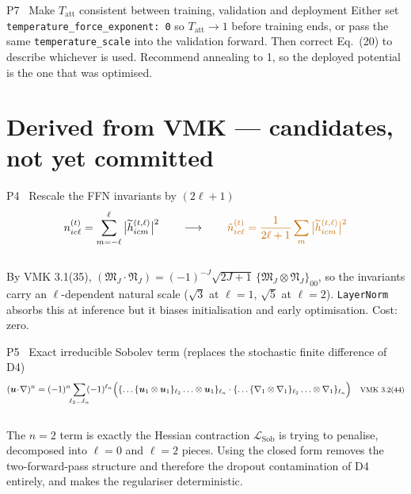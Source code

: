 \documentclass[10pt,a4paper]{article}
\newcommand{\NEW}[1]{\textcolor{NEWblue}{#1}}
\newcommand{\DER}[1]{\textcolor{DERIVorange}{#1}}
\newcommand{\code}[1]{\texttt{\small #1}}
\begin{document}
\begin{planbox}{P7 \ Make $T_{\mathrm{att}}$ consistent between training, validation and deployment}
\footnotesize Either set \code{temperature\_force\_exponent: 0} so
$T_{\mathrm{att}}\!\to\!1$ before training ends, or pass the same
\code{temperature\_scale} into the validation forward. Then correct Eq.~(20) to describe
whichever is used. \NEW{Recommend annealing to 1}, so the deployed potential is the one
that was optimised.
\end{planbox}

\section{\DER{Derived from VMK --- candidates, not yet committed}}

\begin{derbox}{P4 \ Rescale the FFN invariants by $(2\ell+1)$}
\vspace{-6pt}
\begin{equation*}
n^{(t)}_{ic\ell} = \sum_{m=-\ell}^{\ell}\big|\widetilde h^{(t,\ell)}_{icm}\big|^2
\qquad\longrightarrow\qquad
\DER{\hat n^{(t)}_{ic\ell} = \frac{1}{2\ell+1}\sum_m \big|\widetilde h^{(t,\ell)}_{icm}\big|^2}
\end{equation*}
\vspace{-8pt}\\
\footnotesize By VMK 3.1(35), $(\bm{\mathfrak M}_J\cdot\bm{\mathfrak N}_J)
=(-1)^{-J}\sqrt{2J+1}\,\{\bm{\mathfrak M}_J\otimes\bm{\mathfrak N}_J\}_{00}$, so the
invariants carry an $\ell$-dependent natural scale ($\sqrt3$ at $\ell{=}1$, $\sqrt5$ at
$\ell{=}2$). \code{LayerNorm} absorbs this at inference but it biases initialisation and
early optimisation. Cost: zero.
\end{derbox}

\begin{derbox}{P5 \ Exact irreducible Sobolev term (replaces the stochastic finite difference of D4)}
\vspace{-6pt}
\begin{equation*}
(\bm u\!\cdot\!\nabla)^n = (-1)^n\!\!\sum_{\ell_2\ldots\ell_n}\!\!(-1)^{\ell_n}
\Big(\{\ldots\{\bm u_1\otimes\bm u_1\}_{\ell_2}\ldots\otimes\bm u_1\}_{\ell_n}\cdot
\{\ldots\{\nabla_1\otimes\nabla_1\}_{\ell_2}\ldots\otimes\nabla_1\}_{\ell_n}\Big)
\quad\text{\footnotesize VMK 3.2(44)}
\end{equation*}
\vspace{-8pt}\\
\footnotesize The $n=2$ term is exactly the Hessian contraction $\mathcal L_{\mathrm{Sob}}$
is trying to penalise, decomposed into $\ell=0$ and $\ell=2$ pieces. Using the closed form
removes the two-forward-pass structure and therefore the dropout contamination of D4
entirely, and makes the regulariser deterministic.
\end{derbox}
\end{document}

